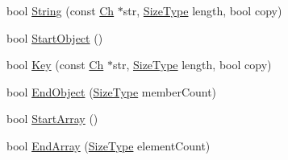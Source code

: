 \begin{DoxyCompactItemize}
\item 
bool \mbox{\hyperlink{classrapidjson_1_1_generic_document_aeab83624e94e75f3f9faa18e0c74ba20}{String}} (const \mbox{\hyperlink{classrapidjson_1_1_generic_value_adcdbc7fa85a9a41b78966d7e0dcc2ac4}{Ch}} $\ast$str, \mbox{\hyperlink{namespacerapidjson_a44eb33eaa523e36d466b1ced64b85c84}{Size\+Type}} length, bool copy)
\item 
bool \mbox{\hyperlink{classrapidjson_1_1_generic_document_acdbdf67f126b45fcf3c7029bdaa930d8}{Start\+Object}} ()
\item 
bool \mbox{\hyperlink{classrapidjson_1_1_generic_document_a4bc59e7ec43a909af155c18e7f948f40}{Key}} (const \mbox{\hyperlink{classrapidjson_1_1_generic_value_adcdbc7fa85a9a41b78966d7e0dcc2ac4}{Ch}} $\ast$str, \mbox{\hyperlink{namespacerapidjson_a44eb33eaa523e36d466b1ced64b85c84}{Size\+Type}} length, bool copy)
\item 
bool \mbox{\hyperlink{classrapidjson_1_1_generic_document_abe5944e40f6a374645a92b4a77bc3b6e}{End\+Object}} (\mbox{\hyperlink{namespacerapidjson_a44eb33eaa523e36d466b1ced64b85c84}{Size\+Type}} member\+Count)
\item 
bool \mbox{\hyperlink{classrapidjson_1_1_generic_document_a5ea841518170c19b896c53dc255fae41}{Start\+Array}} ()
\item 
bool \mbox{\hyperlink{classrapidjson_1_1_generic_document_a544d48e416efb239698e1a55b09aad73}{End\+Array}} (\mbox{\hyperlink{namespacerapidjson_a44eb33eaa523e36d466b1ced64b85c84}{Size\+Type}} element\+Count)
\end{DoxyCompactItemize}
